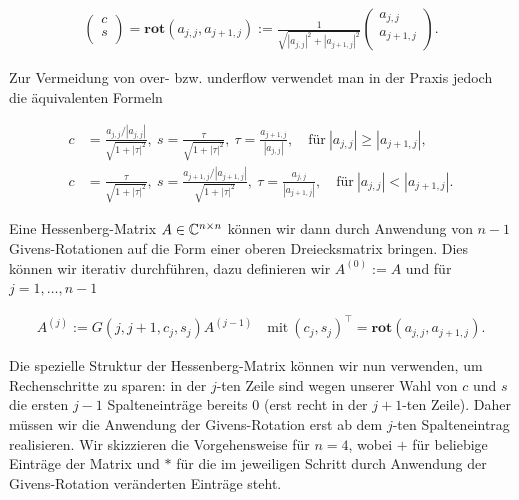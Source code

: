 \documentclass{article}
\theoremstyle{plain}
\begin{document}
\begin{align*}
\left(\begin{array}{c}
    c \\
    s \\
\end{array}\right)
=
\textbf{rot}(a_{j,j},a_{j+1,j})
:=
\frac{1}{\sqrt{|a_{j,j}|^2 + |a_{j+1,j}|^2}}
\left(\begin{array}{c}
a_{j,j} \\
a_{j+1,j} \\
\end{array}\right).
\end{align*}

Zur Vermeidung von over- bzw. underflow verwendet man in der Praxis jedoch die äquivalenten Formeln

\begin{align*}
	c &= \frac{a_{j,j} / |a_{j,j}|}{\sqrt{1+|\tau|^2}},~
	s = \frac{\tau}{\sqrt{1 +|\tau|^2}},~
	\tau = \frac{a_{j+1,j}}{|a_{j,j}|}, \quad
	\text{für}~ |a_{j,j}| \geq |a_{j+1,j}|, \\
	c &= \frac{\tau}{\sqrt{1 +|\tau|^2}},~
	s = \frac{a_{j+1,j} / |a_{j+1,j}|}{\sqrt{1+|\tau|^2}},~
	\tau = \frac{a_{j,j}}{|a_{j+1,j}|}, \quad
	\text{für}~ |a_{j,j}| < |a_{j+1,j}|.
\end{align*}

Eine Hessenberg-Matrix $A \in \mathbb{C}^{n\times n}$ können wir dann durch Anwendung von $n-1$ Givens-Rotationen auf die Form einer oberen Dreiecksmatrix bringen. Dies können wir iterativ durchführen, dazu definieren wir $A^{(0)} := A$ und für $j = 1,\dots, n-1$

\begin{align*}
	A^{(j)} :=
	G(j, j+1, c_j, s_j)A^{(j-1)} \quad
	\text{mit}~
	(c_j, s_j)^\top  = \textbf{rot}(a_{j,j},a_{j+1,j}).
\end{align*}

Die spezielle Struktur der Hessenberg-Matrix können wir nun verwenden, um Rechenschritte zu sparen: in der $j$-ten Zeile sind wegen unserer Wahl von $c$ und $s$ die ersten $j-1$ Spalteneinträge bereits $0$ (erst recht in der $j+1$-ten Zeile). Daher müssen wir die Anwendung der Givens-Rotation erst ab dem $j$-ten Spalteneintrag realisieren. Wir skizzieren die Vorgehensweise für $n=4$, wobei $+$ für beliebige Einträge der Matrix und $*$ für die im jeweiligen Schritt durch Anwendung der Givens-Rotation veränderten Einträge steht.
\end{document}
